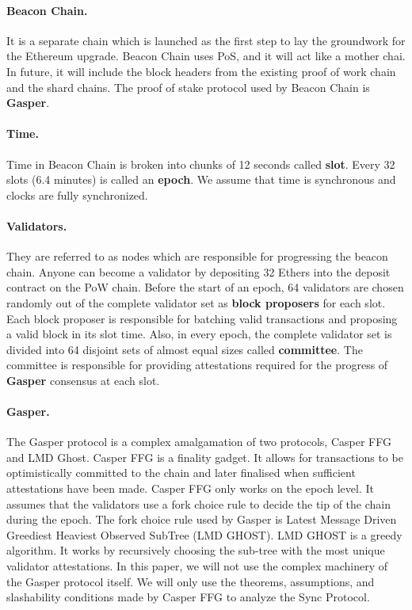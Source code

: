 \documentclass[a4paper,11pt,oneside]{article}
\theoremstyle{definition}
\begin{document}
  \paragraph{Beacon Chain.} It is a separate chain which is launched as the first step to lay the groundwork for the Ethereum upgrade. Beacon Chain uses PoS, and it will act like a mother chai. In future, it will include the block headers from the existing proof of work chain and the shard chains. The proof of stake protocol used by Beacon Chain is \textbf{Gasper}. 
  
  \paragraph{Time.} Time in Beacon Chain is broken into chunks of 12 seconds called \textbf{slot}. Every 32 slots (6.4 minutes) is called an \textbf{epoch}. We assume that time is synchronous and clocks are fully synchronized.

  \paragraph{Validators.} They are referred to as nodes which are responsible for progressing the beacon chain. Anyone can become a validator by depositing 32 Ethers into the deposit contract on the PoW chain. Before the start of an epoch, 64 validators are chosen randomly out of the complete validator set as \textbf{block proposers} for each slot. Each block proposer is responsible for batching valid transactions and proposing a valid block in its slot time. Also, in every epoch, the complete validator set is divided into 64 disjoint sets of almost equal sizes called \textbf{committee}. The committee is responsible for providing attestations required for the progress of \textbf{Gasper} consensus at each slot. 
  
  \paragraph{Gasper.} The Gasper protocol is a complex amalgamation of two protocols, Casper FFG and LMD Ghost. Casper FFG is a finality gadget. It allows for transactions to be optimistically committed to the chain and later finalised when sufficient attestations have been made. Casper FFG only works on the epoch level. It assumes that the validators use a fork choice rule to decide the tip of the chain during the epoch. The fork choice rule used by Gasper is Latest Message Driven Greediest Heaviest Observed SubTree (LMD GHOST)\cite{Gasper}. LMD GHOST is a greedy algorithm. It works by recursively choosing the sub-tree with the most unique validator attestations. In this paper, we will not use the complex machinery of the Gasper protocol itself. We will only use the theorems, assumptions, and slashability conditions made by Casper FFG to analyze the Sync Protocol. 
  
\end{document}
